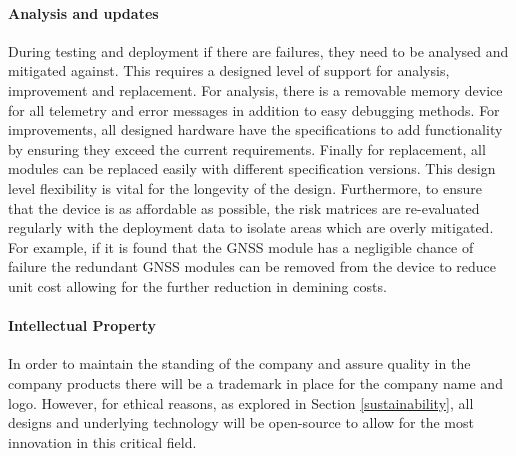 \paragraph{Analysis and updates}
During testing and deployment if there are failures, they need to be analysed and mitigated against. This requires a designed level of support for analysis, improvement and replacement. For analysis, there is a removable memory device for all telemetry and error messages in addition to easy debugging methods. For improvements, all designed hardware have the specifications to add functionality by ensuring they exceed the current requirements. Finally for replacement, all modules can be replaced easily with different specification versions. This design level flexibility is vital for the longevity of the design. Furthermore, to ensure that the device is as affordable as possible, the risk matrices are re-evaluated regularly with the deployment data to isolate areas which are overly mitigated. For example, if it is found that the \gls{GNSS} module has a negligible chance of failure the redundant \gls{GNSS} modules can be removed from the device to reduce unit cost allowing for the further reduction in demining costs.
\paragraph{Intellectual Property}
 In order to maintain the standing of the company and assure quality in the company products there will be a trademark in place for the company name and logo. However, for ethical reasons, as explored in Section \ref{sustainability}, all designs and underlying technology will be open-source to allow for the most innovation in this critical field.